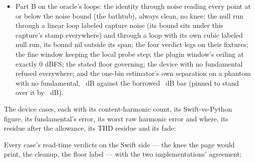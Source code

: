 \documentclass[11pt,a4paper]{article}
\begin{document}
{\begin{itemize}
  \cparityGain); a capture \cparityLatencyFound\ samples late with the
  analyzer told the pre-roll plus that: every read against the undelayed
  capture within \cparityLatencyMove\ (bar \cparityLatency); a window cut \cparityMiscutSamples\ sample late: the
  fundamental moved by \cparityMiscutMove\ dB (bar \cparityMiscut) ---
  the Hann's taper makes a one-sample mis-cut invisible;
  \item Part B on the oracle's loops: the identity through noise reading
  every point at or below the noise bound (the bathtub), always clean, no
  knee; the null run through a linear loop labeled capture noise (its
  bound sits under this capture's stamp everywhere) and through a loop
  with its own cubic labeled null run, its bound nil outside its span;
  the four verdict legs on their fixtures; the fine window keeping the
  local probe step; the plugin window's ceiling at exactly 0 dBFS; the
  stated floor governing; the device with no fundamental refused
  everywhere; and the one-bin estimator's own separation on a phantom
  with no fundamental, \cparitySeparation\ dB against the borrowed
  \cparitySeparationBar\ dB bar (pinned to stand over it by
  \cparitySeparationOverBar\ dB).
\end{itemize}
\par}
\cparityPartBStatus

The device cases, each with its content-harmonic count, its
Swift-vs-Python figure, its fundamental's error, its worst raw harmonic
error and where, its residue after the allowance, its THD residue and
its fade:

\begin{center}\scriptsize\setlength{\tabcolsep}{3pt}\cparityDeviceTable\end{center}

Every case's read-time verdicts on the Swift side --- the knee the page
would print, the cleanup, the floor label --- with the two
implementations' agreement:

\begin{center}\scriptsize\setlength{\tabcolsep}{3pt}\cparityReadTimeTable\end{center}
\end{document}
